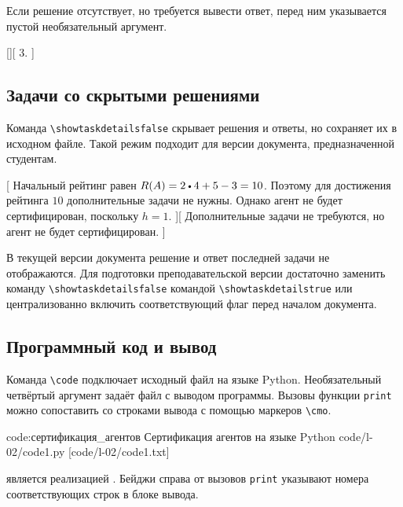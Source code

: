Если решение отсутствует, но требуется вывести ответ, перед ним указывается пустой необязательный аргумент.

[][
    3.
]


\subsection{Задачи со скрытыми решениями}

Команда \verb|\showtaskdetailsfalse| скрывает решения и ответы, но сохраняет их в исходном файле.
Такой режим подходит для версии документа, предназначенной студентам.

\showtaskdetailsfalse

[
    Начальный рейтинг равен $R(A) = 2 \mul 4 + 5 - 3 = 10$.
    Поэтому для достижения рейтинга $10$ дополнительные задачи не нужны.
    Однако агент не будет сертифицирован, поскольку $h = 1$.
][
    Дополнительные задачи не требуются, но агент не будет сертифицирован.
]

В текущей версии документа решение и ответ последней задачи не отображаются.
Для подготовки преподавательской версии достаточно заменить команду \verb|\showtaskdetailsfalse| командой \verb|\showtaskdetailstrue| или централизованно включить соответствующий флаг перед началом документа.


\subsection{Программный код и вывод}

Команда \verb|\code| подключает исходный файл на языке Python.
Необязательный четвёртый аргумент задаёт файл с выводом программы.
Вызовы функции \texttt{print} можно сопоставить со строками вывода с помощью маркеров \verb|\cmo|.

\code
    {code:сертификация_агентов}
    {Сертификация агентов на языке Python}
    {code/l-02/code1.py}
    [code/l-02/code1.txt]

 является реализацией .
Бейджи справа от вызовов \texttt{print} указывают номера соответствующих строк в блоке вывода.